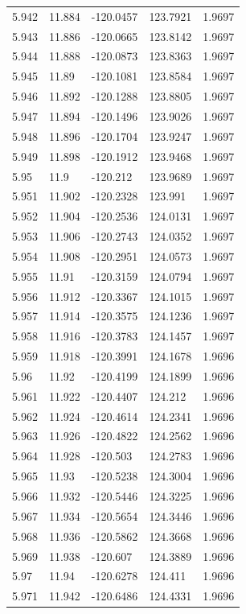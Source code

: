 \begin{tabular}{lllll}
5.942 & 11.884 & -120.0457 & 123.7921 & 1.9697 \\
5.943 & 11.886 & -120.0665 & 123.8142 & 1.9697 \\
5.944 & 11.888 & -120.0873 & 123.8363 & 1.9697 \\
5.945 & 11.89 & -120.1081 & 123.8584 & 1.9697 \\
5.946 & 11.892 & -120.1288 & 123.8805 & 1.9697 \\
5.947 & 11.894 & -120.1496 & 123.9026 & 1.9697 \\
5.948 & 11.896 & -120.1704 & 123.9247 & 1.9697 \\
5.949 & 11.898 & -120.1912 & 123.9468 & 1.9697 \\
5.95 & 11.9 & -120.212 & 123.9689 & 1.9697 \\
5.951 & 11.902 & -120.2328 & 123.991 & 1.9697 \\
5.952 & 11.904 & -120.2536 & 124.0131 & 1.9697 \\
5.953 & 11.906 & -120.2743 & 124.0352 & 1.9697 \\
5.954 & 11.908 & -120.2951 & 124.0573 & 1.9697 \\
5.955 & 11.91 & -120.3159 & 124.0794 & 1.9697 \\
5.956 & 11.912 & -120.3367 & 124.1015 & 1.9697 \\
5.957 & 11.914 & -120.3575 & 124.1236 & 1.9697 \\
5.958 & 11.916 & -120.3783 & 124.1457 & 1.9697 \\
5.959 & 11.918 & -120.3991 & 124.1678 & 1.9696 \\
5.96 & 11.92 & -120.4199 & 124.1899 & 1.9696 \\
5.961 & 11.922 & -120.4407 & 124.212 & 1.9696 \\
5.962 & 11.924 & -120.4614 & 124.2341 & 1.9696 \\
5.963 & 11.926 & -120.4822 & 124.2562 & 1.9696 \\
5.964 & 11.928 & -120.503 & 124.2783 & 1.9696 \\
5.965 & 11.93 & -120.5238 & 124.3004 & 1.9696 \\
5.966 & 11.932 & -120.5446 & 124.3225 & 1.9696 \\
5.967 & 11.934 & -120.5654 & 124.3446 & 1.9696 \\
5.968 & 11.936 & -120.5862 & 124.3668 & 1.9696 \\
5.969 & 11.938 & -120.607 & 124.3889 & 1.9696 \\
5.97 & 11.94 & -120.6278 & 124.411 & 1.9696 \\
5.971 & 11.942 & -120.6486 & 124.4331 & 1.9696 \\

\end{tabular}
